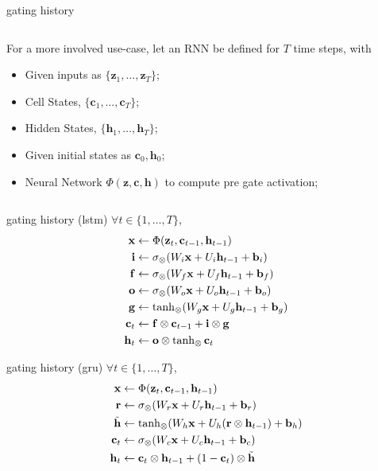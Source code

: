 \documentclass[aspectratio=169,xcolor={dvipsnames,svgnames}]{beamer}
\begin{document}
\begin{frame}[label={sec:org6684e7d}]{gating history}
\begin{columns}
\begin{column}{0.7\columnwidth}
For a more involved use-case, let an RNN be defined for
\(T\) time steps, with
\begin{itemize}
\item Given inputs as
\(\{\mathbf{z}_1,\ldots,\mathbf{z}_T\}\);
\item Cell States, \(\{\mathbf{c}_1,\ldots,\mathbf{c}_T\}\);
\item Hidden States,
\(\{\mathbf{h}_1,\ldots,\mathbf{h}_T\}\);
\item Given initial states as
\(\mathbf{c}_{0},\mathbf{h}_{0}\);
\item Neural Network
\(\Phi(\mathbf{z},\mathbf{c},\mathbf{h})\) to compute
pre gate activation;
\end{itemize}
\end{column}
\end{columns}
\end{frame}
\begin{frame}[label={sec:org8278f2c}]{gating history (lstm)}
\(\forall t\in\{1,\ldots,T\}\),
\begin{align}
  \notag
  \mathbf{x}
  &\gets \Phi(\mathbf{z}_t, \mathbf{c}_{t-1},
    \mathbf{h}_{t-1}) \\
  \notag
  \mathbf{i}
  &\gets
    \sigma_{\otimes}(W_i\mathbf{x}+U_i\mathbf{h}_{t-1}
    + \mathbf{b}_i) \\
  \notag
  \mathbf{f}
  &\gets \sigma_{\otimes} (W_f\mathbf{x} +
    U_f\mathbf{h}_{t-1} + \mathbf{b}_f) \\  
  \notag
  \mathbf{o}
  &\gets \sigma_{\otimes} (W_o\mathbf{x} +
    U_o\mathbf{h}_{t-1} + \mathbf{b}_o) \\ 
  \notag
  \mathbf{g}
  &\gets \tanh_{\otimes} (W_g\mathbf{x} +
    U_g\mathbf{h}_{t-1} + \mathbf{b}_g) \\  
  \notag
  \mathbf{c}_t
  &\gets \mathbf{f}\otimes\mathbf{c}_{t-1} +
    \mathbf{i}\otimes\mathbf{g} \\
  \notag
  \mathbf{h}_t
  &\gets \mathbf{o}\otimes\tanh_{\otimes} \mathbf{c}_t
\end{align}
\end{frame}
\begin{frame}[label={sec:org73c1bfe}]{gating history (gru)}
\(\forall t\in\{1,\ldots,T\}\),
\begin{align}
  \notag
  \mathbf{x}
  &\gets \Phi(\mathbf{z}_t, \mathbf{c}_{t-1},
    \mathbf{h}_{t-1}) \\
  \notag
  \mathbf{r}
  &\gets
    \sigma_{\otimes}(W_r\mathbf{x}+U_r\mathbf{h}_{t-1}
    + \mathbf{b}_r) \\
  \notag
  \tilde{\mathbf{h}}
  &\gets
    \tanh_{\otimes}(W_h\mathbf{x} +
    U_h(\mathbf{r}\otimes\mathbf{h}_{t-1}) +
    \mathbf{b}_h) \\
  \notag
  \mathbf{c}_t
  &\gets
    \sigma_{\otimes}(W_c\mathbf{x}+U_c\mathbf{h}_{t-1}
    + \mathbf{b}_c) \\
  \notag
  \mathbf{h}_t
  &\gets \mathbf{c}_t\otimes \mathbf{h}_{t-1} +
    (1-\mathbf{c}_t) \otimes \tilde{\mathbf{h}}
\end{align}
\end{frame}
\end{document}
